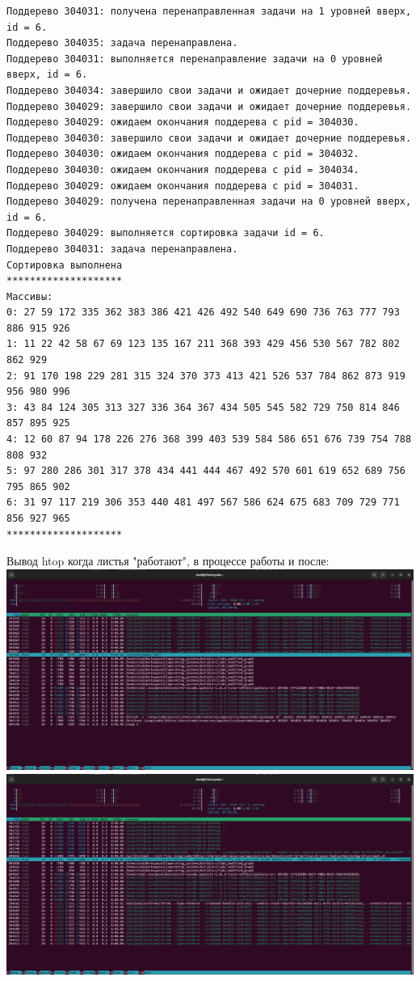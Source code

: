 \documentclass[a4paper,14pt]{extarticle}
\begin{document}
\begin{verbatim}
Поддерево 304031: получена перенаправленная задачи на 1 уровней вверх, id = 6.
Поддерево 304035: задача перенаправлена.
Поддерево 304031: выполняется перенаправление задачи на 0 уровней вверх, id = 6.
Поддерево 304034: завершило свои задачи и ожидает дочерние поддеревья.
Поддерево 304029: завершило свои задачи и ожидает дочерние поддеревья.
Поддерево 304029: ожидаем окончания поддерева с pid = 304030.
Поддерево 304030: завершило свои задачи и ожидает дочерние поддеревья.
Поддерево 304030: ожидаем окончания поддерева с pid = 304032.
Поддерево 304030: ожидаем окончания поддерева с pid = 304034.
Поддерево 304029: ожидаем окончания поддерева с pid = 304031.
Поддерево 304029: получена перенаправленная задачи на 0 уровней вверх, id = 6.
Поддерево 304029: выполняется сортировка задачи id = 6.
Поддерево 304031: задача перенаправлена.
Сортировка выполнена
********************
Массивы:
0: 27 59 172 335 362 383 386 421 426 492 540 649 690 736 763 777 793 886 915 926 
1: 11 22 42 58 67 69 123 135 167 211 368 393 429 456 530 567 782 802 862 929 
2: 91 170 198 229 281 315 324 370 373 413 421 526 537 784 862 873 919 956 980 996 
3: 43 84 124 305 313 327 336 364 367 434 505 545 582 729 750 814 846 857 895 925 
4: 12 60 87 94 178 226 276 368 399 403 539 584 586 651 676 739 754 788 808 932 
5: 97 280 286 301 317 378 434 441 444 467 492 570 601 619 652 689 756 795 865 902 
6: 31 97 117 219 306 353 440 481 497 567 586 624 675 683 709 729 771 856 927 965 
********************
\end{verbatim}
Вывод htop когда листья "работают", в процессе работы и после:\\
\includegraphics[width=140mm]{modified_htop_before}\\
\includegraphics[width=140mm]{modified_htop_mid}\\
\end{document}

